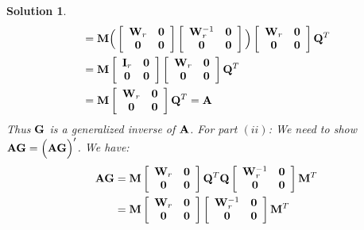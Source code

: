 \documentclass[11pt]{article}
\newtheorem{sol}{Solution}
\begin{document}
\begin{sol}
\begin{align*}
	 	&= {\bf M}\Big(\left[\begin{array}{cc} {\bf W}_r&{\bf 0} \\ {\bf 0}&{\bf 0} \end{array}\right]\left[\begin{array}{cc} {\bf W}^{-1}_r&{\bf 0} \\ {\bf 0}&{\bf 0} \end{array}\right]\Big)\left[\begin{array}{cc} {\bf W}_r&{\bf 0} \\{\bf 0}&{\bf 0}  \end{array}\right]{\bf Q}^T\\
	 	&= {\bf M}\left[\begin{array}{cc} {\bf I}_r&{\bf 0} \\ {\bf 0}& {\bf 0}\end{array}\right]\left[\begin{array}{cc} {\bf W}_r&{\bf 0} \\{\bf 0}&{\bf 0}  \end{array}\right]{\bf Q}^T\\
	 	&= {\bf M}\left[\begin{array}{cc} {\bf W}_r&{\bf 0} \\{\bf 0}&{\bf 0}  \end{array}\right]{\bf Q}^T = {\bf A}
	 \end{align*}
	 Thus ${\bf G}$ is a generalized inverse of ${\bf A}$.\vskip 2mm
	 For part $(ii)$:\vskip 2mm
	 We need to show ${\bf A}{\bf G} = \Big({\bf A}{\bf G}\Big)'$.\vskip 2mm
	 We have:
	 \begin{align*}
	 	{\bf A}{\bf G} &= {\bf M}\left[\begin{array}{cc} {\bf W}_r& {\bf 0}\\ {\bf 0}& {\bf 0}\end{array}\right]{\bf Q}^T{\bf Q}\left[\begin{array}{cc} {\bf W}_r^{-1}& {\bf 0}\\ {\bf 0}&{\bf 0} \end{array}\right]{\bf M}^T\\
	 	&= {\bf M}\left[\begin{array}{cc} {\bf W}_r& {\bf 0}\\ {\bf 0}& {\bf 0}\end{array}\right]\left[\begin{array}{cc} {\bf W}_r^{-1}& {\bf 0}\\ {\bf 0}&{\bf 0} \end{array}\right]{\bf M}^T\\

\end{align*}
\end{sol}
\end{document}
